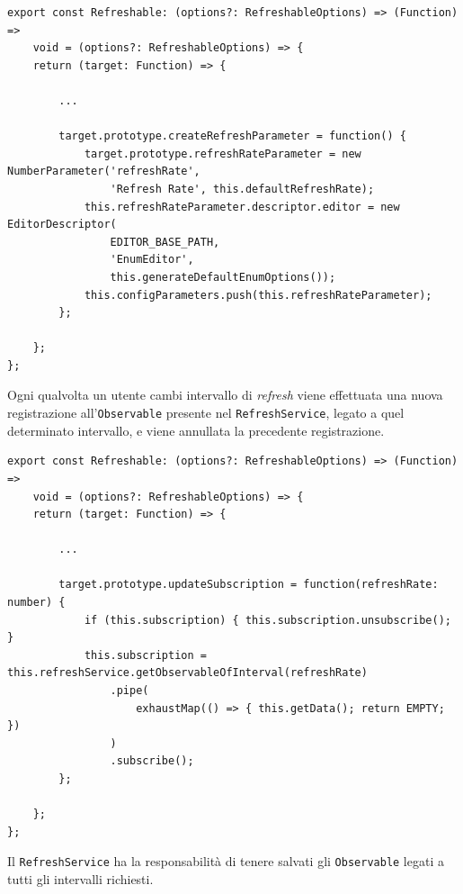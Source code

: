 \begin{lstlisting}[caption={Creazione del refreshRateParameter all'interno del Refreshable decorator}, style=javaScriptCode]
export const Refreshable: (options?: RefreshableOptions) => (Function) => 
    void = (options?: RefreshableOptions) => {
    return (target: Function) => {
        
        ...
        
        target.prototype.createRefreshParameter = function() {
            target.prototype.refreshRateParameter = new NumberParameter('refreshRate', 
                'Refresh Rate', this.defaultRefreshRate);
            this.refreshRateParameter.descriptor.editor = new EditorDescriptor(
                EDITOR_BASE_PATH,
                'EnumEditor',
                this.generateDefaultEnumOptions());
            this.configParameters.push(this.refreshRateParameter);
        };
        
    };
};
\end{lstlisting}
Ogni qualvolta un utente cambi intervallo di \textit{refresh} viene effettuata una nuova registrazione all'\verb|Observable| presente nel \verb|RefreshService|, legato a quel determinato intervallo, e viene annullata la precedente registrazione.

\begin{lstlisting}[caption={Metodo updateSubscription all'interno del Refreshable decorator}, style=javaScriptCode]
export const Refreshable: (options?: RefreshableOptions) => (Function) => 
    void = (options?: RefreshableOptions) => {
    return (target: Function) => {
        
        ...

        target.prototype.updateSubscription = function(refreshRate: number) {
            if (this.subscription) { this.subscription.unsubscribe(); }
            this.subscription = this.refreshService.getObservableOfInterval(refreshRate)
                .pipe(
                    exhaustMap(() => { this.getData(); return EMPTY; })
                )
                .subscribe();
        };
        
    };
};
\end{lstlisting}
Il \verb|RefreshService| ha la responsabilità di tenere salvati gli \verb|Observable| legati a tutti gli intervalli richiesti.

